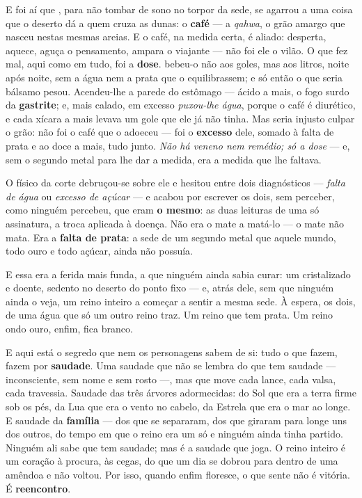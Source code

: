 \documentclass[livro.tex]{subfiles}
\begin{document}
\medskip

E foi aí que \Ven , para não tombar de sono no torpor da sede, se agarrou a uma coisa
que o deserto dá a quem cruza as dunas: o \textbf{café} --- a \emph{qahwa}, o grão
amargo que nasceu nestas mesmas areias. E o café, na medida certa, é aliado: desperta,
aquece, aguça o pensamento, ampara o viajante --- não foi ele o vilão. O que fez mal,
aqui como em tudo, foi a \textbf{dose}. \Ven bebeu-o não aos goles, mas aos litros,
noite após noite, sem a água nem a prata que o equilibrassem; e só então o que seria
bálsamo pesou. Acendeu-lhe a parede do estômago --- ácido a mais, o fogo surdo da
\textbf{gastrite}; e, mais calado, em excesso \emph{puxou-lhe água}, porque o café é
diurético, e cada xícara a mais levava um gole que ele já não tinha. Mas seria
injusto culpar o grão: não foi o café que o adoeceu --- foi o \textbf{excesso} dele,
somado à falta de prata e ao doce a mais, tudo junto. \emph{Não há veneno nem remédio;
só a dose} --- e, sem o segundo metal para lhe dar a medida, era a medida que lhe
faltava.

\medskip

O físico da corte debruçou-se sobre ele e hesitou entre dois diagnósticos ---
\emph{falta de água} ou \emph{excesso de açúcar} --- e acabou por escrever os dois,
sem perceber, como ninguém percebeu, que eram \textbf{o mesmo}: as duas leituras de
uma só assinatura, a troca aplicada à doença. Não era o mate a matá-lo --- o mate
não mata. Era a \textbf{falta de prata}: a sede de um segundo metal que aquele mundo,
todo ouro e todo açúcar, ainda não possuía.

\medskip

E essa era a ferida mais funda, a que ninguém ainda sabia curar: um
\Ven cristalizado e doente, sedento no deserto do ponto fixo --- e, atrás dele, sem
que ninguém ainda o veja, um reino inteiro a começar a sentir a mesma sede. À espera,
os dois, de uma água que só um outro reino traz. Um reino que tem prata. Um reino
ondo ouro, enfim, fica branco.

\medskip

E aqui está o segredo que nem os personagens sabem de si: tudo o que fazem, fazem por
\textbf{saudade}. Uma saudade que não se lembra do que tem saudade --- inconsciente, sem
nome e sem rosto ---, mas que move cada lance, cada valsa, cada travessia. Saudade das
três árvores adormecidas: do Sol que era a terra firme sob os pés, da Lua que era o
vento no cabelo, da Estrela que era o mar ao longe. E saudade da \textbf{família} --- dos
que se separaram, dos que giraram para longe uns dos outros, do tempo em que o reino era
um só e ninguém ainda tinha partido. Ninguém ali sabe que tem saudade; mas é a saudade
que joga. O reino inteiro é um coração à procura, às cegas, do que um dia se dobrou para
dentro de uma amêndoa e não voltou. Por isso, quando enfim floresce, o que sente não é
vitória. É \textbf{reencontro}.
\end{document}
